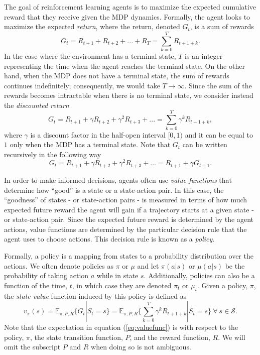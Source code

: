 The goal of reinforcement learning agents is to maximize the expected cumulative reward that they receive given the MDP dynamics. Formally, the agent looks to maximize the expected \textit{return}, where the return, denoted $G_t$, is a sum of rewards
\begin{equation}
\label{eq:return}
G_t = R_{t+1} + R_{t+2} + ... + R_T = \sum^T_{k=0} R_{t+1+k}.
\end{equation}
In the case where the environment has a terminal state, $T$ is an integer representing the time when the agent reaches the terminal state.
On the other hand, when the MDP does not have a terminal state, the sum of rewards continues indefinitely; consequently, we would take $T \rightarrow \infty$.
Since the sum of the rewards becomes intractable when there is no terminal state, we consider instead the \textit{discounted return}
\begin{equation}
\label{eq:disreturn}
G_t = R_{t+1} + \gamma R_{t+2} + \gamma^2 R_{t+3} + ... = \sum^T_{k=0} \gamma^k R_{t+1+k},
\end{equation}
where $\gamma$ is a discount factor in the half-open interval $[0,1)$ and it can be equal to $1$ only when the MDP has a terminal state. Note that $G_t$ can be written recursively in the following way
\begin{equation}
\label{eq:rec_return}
G_t = R_{t+1} + \gamma R_{t+2} + \gamma^2 R_{t+3} + ... = R_{t+1} + \gamma G_{t+1}.
\end{equation}

In order to make informed decisions, agents often use \textit{value functions} that determine how ``good'' is a state or a state-action pair. 
In this case, the ``goodness'' of states - or state-action pairs - is measured in terms of how much expected future reward the agent will gain if a trajectory starts at a given state - or state-action pair.
Since the expected future reward is determined by the agent actions, value functions are determined by the particular decision rule that the agent uses to choose actions. This decision rule is known as a \textit{policy}.

Formally, a policy is a mapping from states to a probability distribution over the actions.
We often denote policies as $\pi$ or $\mu$ and let $\pi(a|s)$ or $\mu(a|s)$ be the probability of taking action $a$ while in state $s$. 
Additionally, policies can also be a function of the time, $t$, in which case they are denoted $\pi_t$ or $\mu_t$.
Given a policy, $\pi$, the \textit{state-value} function induced by this policy is defined as
\begin{equation}
\label{eq:valuefunc}
v_\pi(s) \overset{.}{=} \mathbb{E}_{\pi, P, R} \{ G_t | S_t = s \} = 
	\mathbb{E}_{\pi, P, R} \Big\{ \sum^T_{k=0} \gamma^k R_{t+1+k} | S_t = s \Big\} 
    \ \forall \ s \in \mathcal{S}.
\end{equation}
Note that the expectation in equation (\ref{eq:valuefunc}) is with respect to the policy, $\pi$, the state transition function, $P$, and the reward function, $R$. We will omit the subscript $P$ and $R$ when doing so is not ambiguous. 

